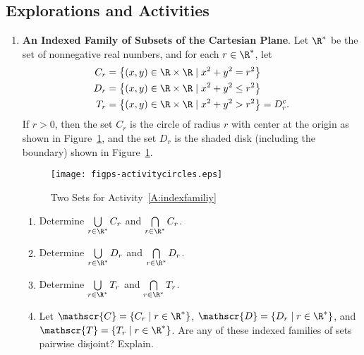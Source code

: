 \subsection*{Explorations and Activities}
\setcounter{oldenumi}{\theenumi}
\begin{enumerate} \setcounter{enumi}{\theoldenumi}
  \item \textbf{An Indexed Family of Subsets of the Cartesian Plane}.  \label{A:indexfamiliy}
Let $\R^*$ be the set of nonnegative real numbers, and for each $r \in \R^*$, let
\[
\begin{aligned}
C_r &= \left\{ (x, y) \in \R \times \R \mid x^2 + y^2 = r^2 \right\} \\
D_r &= \left\{ (x, y) \in \R \times \R \mid x^2 + y^2 \leq r^2 \right\} \\
T_r &= \left\{ (x, y) \in \R \times \R \mid x^2 + y^2 > r^2 \right\} = D_r^c. \\
\end{aligned}
\]
If $r > 0$, then the set $C_r$ is the circle of radius $r$ with center at the origin as shown in 
Figure~\ref{fig:activity-index}, and the set $D_r$ is the shaded disk (including the boundary) shown in Figure~\ref{fig:activity-index}.

\begin{figure}[h]
\begin{center}
\texttt{[image: figps-activitycircles.eps]}
\end{center}
\caption{Two Sets for Activity~\ref{A:indexfamiliy}} \label{fig:activity-index}
\end{figure}

\begin{enumerate}
\item Determine $\bigcup\limits_{r \in \R^*}^{}C_r$ and $\bigcap\limits_{r \in \R^*}^{}C_r$.

\item Determine $\bigcup\limits_{r \in \R^*}^{}D_r$ and $\bigcap\limits_{r \in \R^*}^{}D_r$.

\item Determine $\bigcup\limits_{r \in \R^*}^{}T_r$ and $\bigcap\limits_{r \in \R^*}^{}T_r$.

\item Let $\mathscr{C} = \left\{ C_r \mid r \in \R^* \right\}$, 
$\mathscr{D} = \left\{ D_r \mid r \in \R^* \right\}$, and 
$\mathscr{T} = \left\{ T_r \mid r \in \R^* \right\}$.  Are any of these indexed families of sets pairwise disjoint?  Explain.
\end{enumerate}


\end{enumerate}
